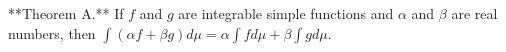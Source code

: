 **Theorem A.** If $f$ and $g$ are integrable simple functions and $\alpha$ and $\beta$ are real numbers, then $\int (\alpha f + \beta g) d\mu = \alpha \int f d\mu + \beta \int g d\mu$.
